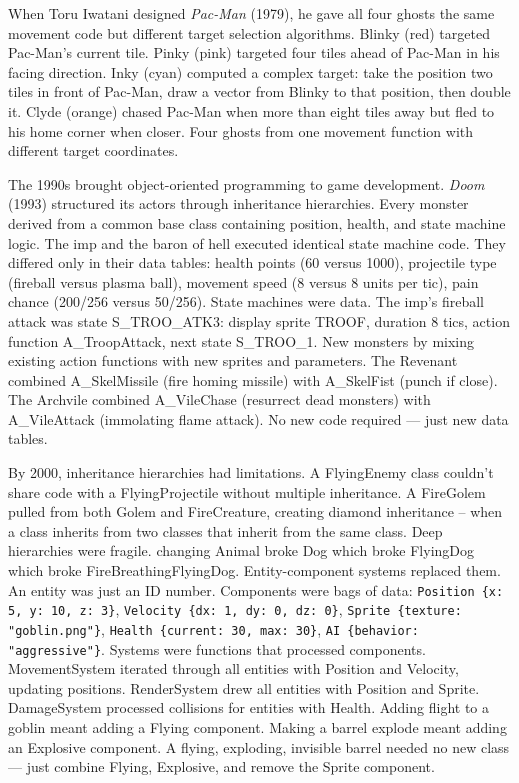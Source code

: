  When Toru Iwatani designed \emph{Pac-Man} (1979), he gave all four ghosts the same movement code but different target selection algorithms. Blinky (red) targeted Pac-Man's current tile. Pinky (pink) targeted four tiles ahead of Pac-Man in his facing direction. Inky (cyan) computed a complex target: take the position two tiles in front of Pac-Man, draw a vector from Blinky to that position, then double it. Clyde (orange) chased Pac-Man when more than eight tiles away but fled to his home corner when closer. Four ghosts from one movement function with different target coordinates.

The 1990s brought object-oriented programming to game development. \emph{Doom} (1993) structured its actors through inheritance hierarchies. Every monster derived from a common base class containing position, health, and state machine logic. The imp and the baron of hell executed identical state machine code. They differed only in their data tables: health points (60 versus 1000), projectile type (fireball versus plasma ball), movement speed (8 versus 8 units per tic), pain chance (200/256 versus 50/256). State machines were data. The imp's fireball attack was state S\_TROO\_ATK3: display sprite TROOF, duration 8 tics, action function A\_TroopAttack, next state S\_TROO\_1. New monsters by mixing existing action functions with new sprites and parameters. The Revenant combined A\_SkelMissile (fire homing missile) with A\_SkelFist (punch if close). The Archvile combined A\_VileChase (resurrect dead monsters) with A\_VileAttack (immolating flame attack). No new code required — just new data tables.

By 2000, inheritance hierarchies had limitations. A FlyingEnemy class couldn't share code with a FlyingProjectile without multiple inheritance. A FireGolem pulled from both Golem and FireCreature, creating diamond inheritance – when a class inherits from two classes that inherit from the same class. Deep hierarchies were fragile. changing Animal broke Dog which broke FlyingDog which broke FireBreathingFlyingDog. Entity-component systems replaced them. An entity was just an ID number. Components were bags of data: \texttt{Position \{x: 5, y: 10, z: 3\}}, \texttt{Velocity \{dx: 1, dy: 0, dz: 0\}}, \texttt{Sprite \{texture: "goblin.png"\}}, \texttt{Health \{current: 30, max: 30\}}, \texttt{AI \{behavior: "aggressive"\}}. Systems were functions that processed components. MovementSystem iterated through all entities with Position and Velocity, updating positions. RenderSystem drew all entities with Position and Sprite. DamageSystem processed collisions for entities with Health. Adding flight to a goblin meant adding a Flying component. Making a barrel explode meant adding an Explosive component. A flying, exploding, invisible barrel needed no new class — just combine Flying, Explosive, and remove the Sprite component.

